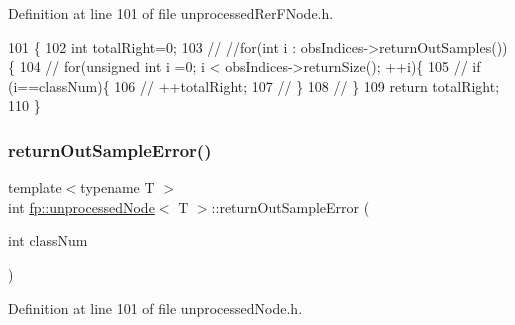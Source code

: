 Definition at line 101 of file unprocessed\+Rer\+F\+Node.\+h.


\begin{DoxyCode}
101                                                              \{
102                     \textcolor{keywordtype}{int} totalRight=0;
103                     \textcolor{comment}{//  //for(int i : obsIndices->returnOutSamples())\{}
104                     \textcolor{comment}{//  for(unsigned int i =0; i <  obsIndices->returnSize(); ++i)\{}
105                     \textcolor{comment}{//      if (i==classNum)\{}
106                     \textcolor{comment}{//      ++totalRight;}
107                     \textcolor{comment}{//      \}}
108                     \textcolor{comment}{//      \}}
109                     \textcolor{keywordflow}{return} totalRight;
110                 \}
\end{DoxyCode}
\mbox{\label{classfp_1_1unprocessedNode_afbeba7b37bd021e36545af60676f05d5}} 
\subsubsection{\texorpdfstring{return\+Out\+Sample\+Error()}{returnOutSampleError()}\hspace{0.1cm}{\footnotesize\ttfamily [2/2]}}
{\footnotesize\ttfamily template$<$typename T $>$ \\
int \hyperlink{classfp_1_1unprocessedNode}{fp\+::unprocessed\+Node}$<$ T $>$\+::return\+Out\+Sample\+Error (\begin{DoxyParamCaption}\item[{int}]{class\+Num }\end{DoxyParamCaption})\hspace{0.3cm}{\ttfamily [inline]}}



Definition at line 101 of file unprocessed\+Node.\+h.


